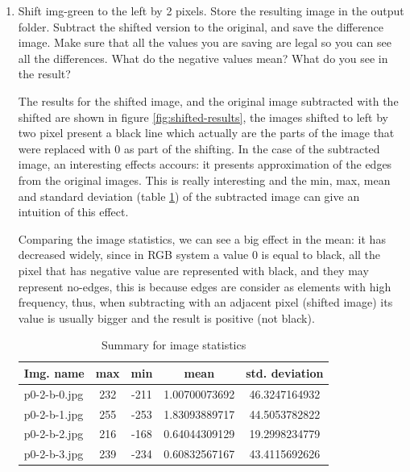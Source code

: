 \begin{enumerate}[label=\emph{\alph*)}]
\item Shift img-green to the left by 2 pixels. Store the resulting image in the output folder. Subtract the shifted version to the original, and save the difference image. Make sure that all the values you are saving are legal so you can see all the differences. What do the negative values mean? What do you see in the result?

The results for the shifted image, and the original image subtracted with the shifted are shown in figure \ref{fig:shifted-results}, the images shifted to left by two pixel present a black line which actually are the parts of the image that were replaced with 0 as part of the shifting. In the case of the subtracted image, an interesting effects accours: it presents approximation of the edges from the original images. This is really interesting and the min, max, mean and standard deviation (table \ref{table:statistics-shifted}) of the subtracted image can give an intuition of this effect.

Comparing the image statistics, we can see a big effect in the mean: it has decreased widely, since in RGB system a value 0 is equal to black, all the pixel that has negative value are represented with black, and they may represent no-edges, this is because edges are consider as elements with high frequency, thus, when subtracting with an adjacent pixel (shifted image) its value is usually bigger and the result is positive (not black).


\begin{table} [!htb]
\setlength{\tabcolsep}{2.7mm}
\centering
\begin{tabular}{lcccc}
\toprule
\textbf{Img. name}  & \textbf{max} & \textbf{min} & \textbf{mean} & \textbf{std. deviation}\\
\midrule
p0-2-b-0.jpg & 232 & -211 & 1.00700073692 & 46.3247164932 \\
p0-2-b-1.jpg & 255 & -253 & 1.83093889717 & 44.5053782822 \\
p0-2-b-2.jpg & 216 & -168 & 0.64044309129 & 19.2998234779 \\
p0-2-b-3.jpg & 239 & -234 & 0.60832567167 & 43.4115692626 \\
\bottomrule
\end{tabular}
\caption{Summary for image statistics}
\label{table:statistics-shifted}
\end{table}


\end{enumerate}
